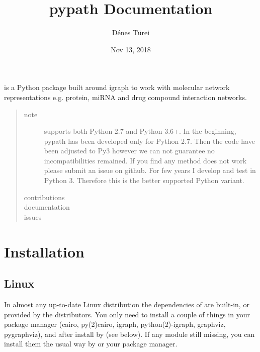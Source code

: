 \documentclass[letterpaper,10pt,english]{sphinxmanual}
\title{pypath Documentation}
\date{Nov 13, 2018}
\author{Dénes Türei}
\begin{document}
\maketitle
\sphinxtableofcontents
{}\label{\detokenize{index::doc}}


 is a Python package built around igraph to work with molecular
network representations e.g. protein, miRNA and drug compound interaction
networks.
\begin{quote}\begin{description}
\item[{note}] \leavevmode
{} supports both Python 2.7 and Python 3.6+. In the beginning,
pypath has been developed only for Python 2.7. Then the code have been
adjusted to Py3 however we can not guarantee no incompatibilities
remained. If you find any method does not work please submit an issue on
github. For few years I develop and test  in Python 3. Therefore
this is the better supported Python variant.

\item[{contributions}] \leavevmode
{}

\item[{documentation}] \leavevmode
{}

\item[{issues}] \leavevmode
{}

\end{description}\end{quote}


\chapter{Installation}
\label{\detokenize{installation:installation}}\label{\detokenize{installation::doc}}

\section{Linux}
\label{\detokenize{installation:linux}}
In almost any up-to-date Linux distribution the dependencies of  are
built-in, or provided by the distributors. You only need to install a couple
of things in your package manager (cairo, py(2)cairo, igraph,
python(2)-igraph, graphviz, pygraphviz), and after install  by 
(see below). If any module still missing, you can install them the usual way
by  or your package manager.
\end{document}
